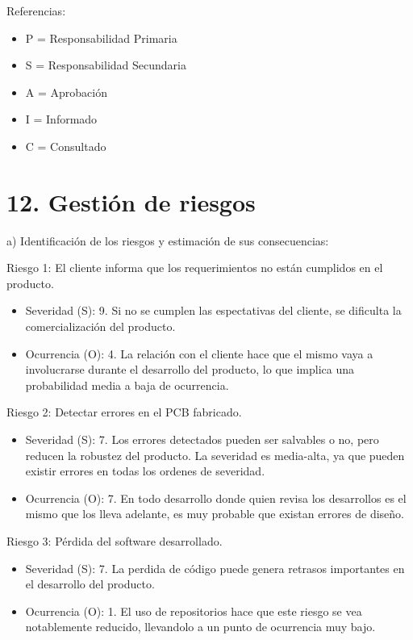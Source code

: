 \documentclass[11pt]{charter}
\begin{document}
Referencias:
\begin{itemize}
\item P = Responsabilidad Primaria
\item S = Responsabilidad Secundaria
\item A = Aprobación
\item I = Informado
\item C = Consultado
\end{itemize}

\section{12. Gestión de riesgos}
\label{sec:riesgos}

a) Identificación de los riesgos y estimación de sus consecuencias:

Riesgo 1: El cliente informa que los requerimientos no están cumplidos en el producto.
\begin{itemize}
\item Severidad (S): 9. Si no se cumplen las espectativas del cliente, se dificulta la comercialización del producto.
\item Ocurrencia (O): 4. La relación con el cliente hace que el mismo  vaya a involucrarse durante el desarrollo del producto, lo que implica una probabilidad media a baja de ocurrencia.
\end{itemize}

Riesgo 2: Detectar errores en el PCB fabricado.
\begin{itemize}
\item Severidad (S): 7. Los errores detectados pueden ser salvables o no, pero reducen la robustez del producto. La severidad es media-alta, ya que pueden existir errores en todas los ordenes de severidad.
\item Ocurrencia (O): 7. En todo desarrollo donde quien revisa los desarrollos es el mismo que los lleva adelante, es muy probable que existan errores de diseño.
\end{itemize}

Riesgo 3: Pérdida del software desarrollado.
\begin{itemize}
\item Severidad (S): 7. La perdida de código puede genera retrasos importantes en el desarrollo del producto.
\item Ocurrencia (O): 1. El uso de repositorios hace que este riesgo se vea notablemente reducido, llevandolo a un punto de ocurrencia muy bajo.
\end{itemize}
\end{document}
